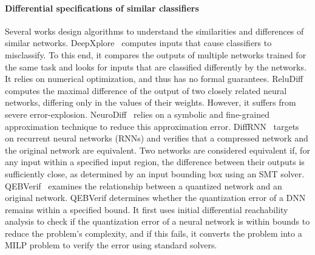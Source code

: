 \paragraph{Differential specifications of similar classifiers}
Several works design algorithms to understand the similarities and differences of similar networks.
DeepXplore~\cite{DEEPXPLORE} computes inputs that cause classifiers to misclassify. 
To this end, it compares the outputs of multiple networks trained for the same task and looks for inputs that are classified differently by the networks. It relies on numerical optimization, and thus has no formal guarantees. %
ReluDiff~\cite{RELUDIFF} computes the maximal difference of the output of two closely related neural networks, differing only in the values of their weights. However, it suffers from severe error-explosion. NeuroDiff~\cite{NEURODIFF} relies on a symbolic and fine-grained approximation technique to reduce this approximation error.
DiffRNN~\cite{DIFFRNN} targets on recurrent neural networks (RNNs) and verifies that a compressed network and the original network are equivalent. Two networks are considered equivalent if, for any input within a specified input region, the difference between their outputs is sufficiently close, as determined by an input bounding box using an SMT solver.
QEBVerif~\cite{QEBVERIF} examines the relationship between a quantized network and an original network. QEBVerif determines whether the quantization error of a DNN remains within a specified bound. 
It first uses initial differential reachability analysis to check if the quantization error of a neural network is within bounds to reduce the problem's complexity, and if this fails, it converts the problem into a MILP problem to verify the error using standard solvers.  %
